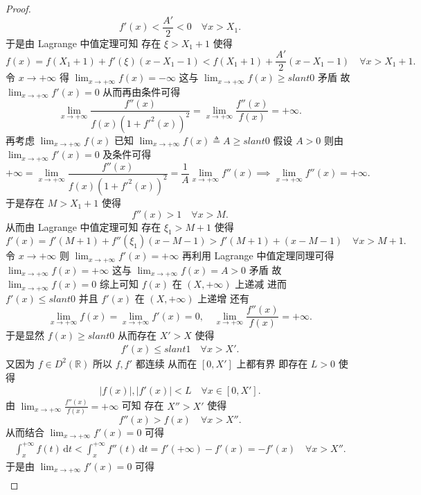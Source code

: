 \documentclass[../../main.tex]{subfiles}
\begin{document}
\begin{proof}
\[
f'(x) < \frac{A'}{2} < 0 \quad \forall x > X_1.
\]
于是由 Lagrange 中值定理可知 存在 \( \xi > X_1 + 1 \) 使得
\[
f(x) = f(X_1 + 1) + f'(\xi)(x - X_1 - 1) < f(X_1 + 1) + \frac{A'}{2}(x - X_1 - 1) \quad \forall x > X_1 + 1.
\]
令 \( x \to +\infty \) 得 \( \lim_{x \to +\infty} f(x) = -\infty \) 这与 \( \lim_{x \to +\infty} f(x) \geqslant slant 0 \) 矛盾 故 \( \lim_{x \to +\infty} f'(x) = 0 \) 从而再由条件可得
\[
\lim_{x \to +\infty} \frac{f''(x)}{f(x)(1 + f'^2(x))^2} = \lim_{x \to +\infty} \frac{f''(x)}{f(x)} = +\infty.
\]
再考虑 \( \lim_{x \to +\infty} f(x) \) 已知 \( \lim_{x \to +\infty} f(x) \triangleq A \geqslant slant 0 \) 假设 \( A > 0 \) 则由 \( \lim_{x \to +\infty} f'(x) = 0 \) 及条件可得
\[
+\infty = \lim_{x \to +\infty} \frac{f''(x)}{f(x)(1 + f'^2(x))^2} = \frac{1}{A} \lim_{x \to +\infty} f''(x) \implies \lim_{x \to +\infty} f''(x) = +\infty.
\]
于是存在 \( M > X_1 + 1 \) 使得
\[
f''(x) > 1 \quad \forall x > M.
\]
从而由 Lagrange 中值定理可知 存在 \( \xi_1 > M + 1 \) 使得
\[
f'(x) = f'(M + 1) + f''(\xi_1)(x - M - 1) > f'(M + 1) + (x - M - 1) \quad \forall x > M + 1.
\]
令 \( x \to +\infty \) 则 \( \lim_{x \to +\infty} f'(x) = +\infty \) 再利用 Lagrange 中值定理同理可得 \( \lim_{x \to +\infty} f(x) = +\infty \) 这与 \( \lim_{x \to +\infty} f(x) = A > 0 \) 矛盾 故 \( \lim_{x \to +\infty} f(x) = 0 \) 综上可知 \( f(x) \) 在 \( (X, +\infty) \) 上递减 进而 \( f'(x) \leqslant slant 0 \) 并且 \( f'(x) \) 在 \( (X, +\infty) \) 上递增 还有
\[
\lim_{x \to +\infty} f(x) = \lim_{x \to +\infty} f'(x) = 0, \quad \lim_{x \to +\infty} \frac{f''(x)}{f(x)} = +\infty.
\]
于是显然 \( f(x) \geqslant slant 0 \) 从而存在 \( X' > X \) 使得
\begin{align}
f'(x) \leqslant slant 1 \quad \forall x > X' \label{100.21}.
\end{align}
又因为 \( f \in D^2(\mathbb{R}) \) 所以 \( f, f' \) 都连续 从而在 \( [0, X'] \) 上都有界 即存在 \( L > 0 \) 使得
\begin{align}
|f(x)|, |f'(x)| < L \quad \forall x \in [0, X'] \label{100.20}.
\end{align}
由 \( \lim_{x \to +\infty} \frac{f''(x)}{f(x)} = +\infty \) 可知 存在 \( X'' > X' \) 使得
\[
f''(x) > f(x) \quad \forall x > X''.
\]
从而结合 \( \lim_{x \to +\infty} f'(x) = 0 \) 可得
\begin{align}
\int_x^{+\infty} f(t) \, \mathrm{d}t < \int_x^{+\infty} f''(t) \, \mathrm{d}t = f'(+\infty) - f'(x) = -f'(x) \quad \forall x > X'' \label{100.18}.
\end{align}
于是由 \( \lim_{x \to +\infty} f'(x) = 0 \) 可得
\begin{align}

\end{align}
\end{proof}
\end{document}
